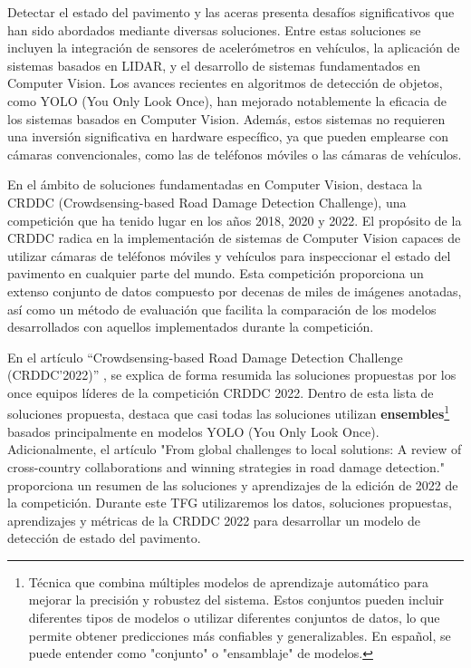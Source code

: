 
Detectar el estado del pavimento y las aceras presenta desafíos significativos que han sido abordados mediante diversas soluciones. Entre estas soluciones se incluyen la integración de sensores de acelerómetros en vehículos\cite{Pavement_Anomalies_Accelerometer}, la aplicación de sistemas basados en LIDAR\cite{LIDAR_Blasiis}\cite{LIDAR_VanDerHorst}, y el desarrollo de sistemas fundamentados en Computer Vision. Los avances recientes en algoritmos de detección de objetos, como YOLO (You Only Look Once), han mejorado notablemente la eficacia de los sistemas basados en Computer Vision. Además, estos sistemas no requieren una inversión significativa en hardware específico, ya que pueden emplearse con cámaras convencionales, como las de teléfonos móviles o las cámaras de vehículos.

En el ámbito de soluciones fundamentadas en Computer Vision, destaca la CRDDC (Crowdsensing-based Road Damage Detection Challenge), una competición que ha tenido lugar en los años 2018, 2020 y 2022. El propósito de la CRDDC radica en la implementación de sistemas de Computer Vision capaces de utilizar cámaras de teléfonos móviles y vehículos para inspeccionar el estado del pavimento en cualquier parte del mundo. Esta competición proporciona un extenso conjunto de datos compuesto por decenas de miles de imágenes anotadas, así como un método de evaluación que facilita la comparación de los modelos desarrollados con aquellos implementados durante la competición.

En el artículo “Crowdsensing-based Road Damage Detection Challenge (CRDDC’2022)” \cite{CRDDC2022_paper}, se explica de forma resumida las soluciones propuestas por los once equipos líderes de la competición CRDDC 2022. Dentro de esta lista de soluciones propuesta, destaca que casi todas las soluciones utilizan \textbf{ensembles}\footnote{Técnica que combina múltiples modelos de aprendizaje automático para mejorar la precisión y robustez del sistema. Estos conjuntos pueden incluir diferentes tipos de modelos o utilizar diferentes conjuntos de datos, lo que permite obtener predicciones más confiables y generalizables. En español, se puede entender como "conjunto" o "ensamblaje" de modelos.} basados principalmente en modelos YOLO (You Only Look Once). Adicionalmente, el artículo "From global challenges to local solutions: A review of cross-country collaborations and winning strategies in road damage detection." \cite{CRDDC2022_review} proporciona un resumen de las soluciones y aprendizajes de la edición de 2022 de la competición. Durante este TFG utilizaremos los datos, soluciones propuestas, aprendizajes y métricas de la CRDDC 2022 para desarrollar un modelo de detección de estado del pavimento.

